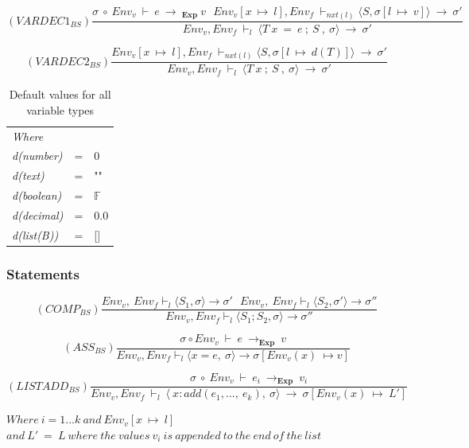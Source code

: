 \begin{equation}
    (VARDEC1_{BS})\frac{\sigma \ \circ \ Env_v \ \vdash \ e \ \rightarrow \ _{\textbf{Exp}} \ v \ \ \ Env_v[x \ \mapsto \ l], Env_f \ \vdash _{nxt(l)} \langle S, \sigma[l \ \mapsto \ v] \rangle \ \rightarrow \ \sigma'}
    {Env_v, Env_f \ \vdash _l \ \langle T \ x \ = \ e \ ; \  S \ , \ \sigma \rangle \ \rightarrow \ \sigma'}
\end{equation}

\begin{equation}
    (VARDEC2_{BS})\frac{Env_v[x \ \mapsto \ l], Env_f \ \vdash _{nxt(l)} \langle S, \sigma[l \ \mapsto \ d(T)] \rangle \ \rightarrow \ \sigma'}
    {Env_v, Env_f \ \vdash _l \ \langle T \ x \ ; \  S \ , \ \sigma \rangle \ \rightarrow \ \sigma'}
\end{equation}

\begin{table}[H]
\centering
\begin{tabular}{lll}
\textit{Where} & & \\
\textit{d(number)}  & = & 0      \\
\textit{d(text)}    & = & ""     \\
\textit{d(boolean)} & = & $\mathbb{F}$ \\
\textit{d(decimal)} & = & 0.0    \\
\textit{d(list(B))} & = & {[}{]}
\end{tabular}
\caption{Default values for all variable types}
\end{table}

\subsubsection{Statements}

\begin{equation} 
    (COMP_{BS})\frac{Env_v,\ Env_f \vdash _l \langle S_1, \sigma \rangle \rightarrow  \sigma ' \ \ \ Env_v,\ Env_f \vdash _l \langle S_2, \sigma' \rangle \rightarrow \sigma ''}{Env_v, Env_f \vdash _l \langle S_1;S_2, \sigma \rangle \rightarrow  \sigma ''}
\end{equation}

\begin{equation} 
    (ASS_{BS})\frac{\sigma \circ Env_v \ \vdash\ e\ \rightarrow _{\mathbf{Exp}} \ v}{Env_v, Env_f \vdash _l \langle x = e,\ \sigma \rangle \rightarrow \sigma[Env_v(x)\ \mapsto v]}
\end{equation}

\begin{equation}
    (LISTADD_{BS})\frac{\sigma \ \circ \ Env_v \ \vdash \ e_i \ \rightarrow _{\textbf{Exp}} \ v_i}
    {Env_v, Env_f \ \vdash _l \ \langle \ x:add(e_1, ... , \ e_k), \ \sigma \rangle \ \rightarrow \ \sigma[Env_v(x) \ \mapsto \ L']}
\end{equation}
\begin{center}
$Where \ i = 1...k \ and  \ Env_v[x \ \mapsto \ l]$ \\
$and \ L' \ = \ L \ where \ the \ values \ v_i \ is \ appended \ to \ the \ end \ of \ the \ list$ \\
\end{center}


